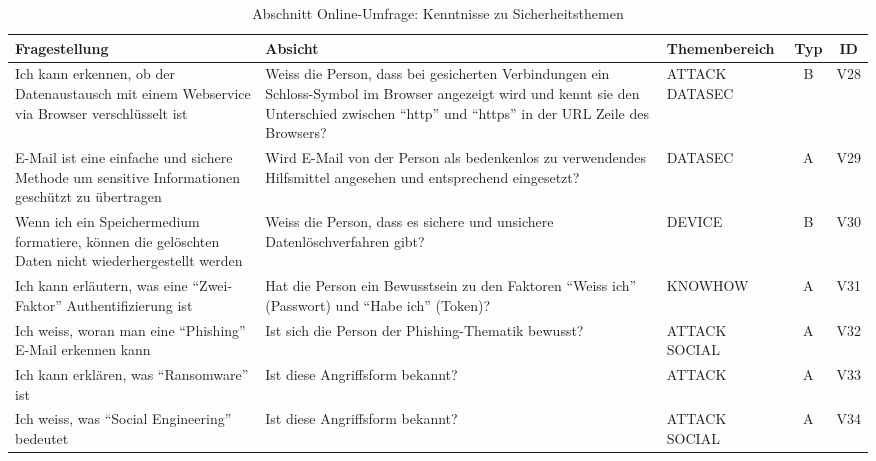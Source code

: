 \documentclass[../../main.tex]{subfiles}
\begin{document}
\begin{table}[H]
\tablefontsize	
\centering
\caption{Abschnitt Online-Umfrage: Kenntnisse zu Sicherheitsthemen}
\label{Kenntnisse zu Sicherheitsthemen}
\begin{tabular}{ |p{5.5cm}|p{5.5cm}|p{2.5cm}|c|c|}

\hline
\tableheaderbgcolor
\textbf{Fragestellung} & \textbf{Absicht} & \textbf{Themenbereich} & \textbf{Typ} & \textbf{ID}\\ 
\hline

Ich kann erkennen, ob der Datenaustausch mit einem Webservice via Browser verschlüsselt ist & Weiss die Person, dass bei gesicherten Verbindungen ein Schloss-Symbol im Browser angezeigt wird und kennt sie  den Unterschied zwischen "`http"' und "`https"' in der URL Zeile des Browsers? & ATTACK \newline DATASEC & B & V28 \\
\hline

E-Mail ist eine einfache und sichere Methode um sensitive Informationen geschützt zu übertragen & Wird E-Mail von der Person als bedenkenlos zu verwendendes Hilfsmittel angesehen und entsprechend eingesetzt? & DATASEC & A & V29 \\
\hline

Wenn ich ein Speichermedium formatiere, können die gelöschten Daten nicht wiederhergestellt werden & Weiss die Person, dass es sichere und unsichere Datenlöschverfahren gibt? & DEVICE & B & V30 \\
\hline

Ich kann erläutern, was eine "`Zwei-Faktor"' Authentifizierung ist & Hat die Person ein Bewusstsein zu den Faktoren "`Weiss ich"' (Passwort) und "`Habe ich"' (Token)? & KNOWHOW & A & V31 \\
\hline

Ich weiss, woran man eine "`Phishing"' E-Mail erkennen kann & Ist sich die Person der Phishing-Thematik bewusst? & ATTACK \newline SOCIAL & A & V32 \\
\hline

Ich kann erklären, was "`Ransomware"' ist & Ist diese Angriffsform bekannt? & ATTACK & A & V33 \\
\hline

Ich weiss, was "`Social Engineering"' bedeutet & Ist diese Angriffsform bekannt? & ATTACK \newline SOCIAL & A & V34 \\
\hline

\end{tabular}
\end{table}
\end{document}
